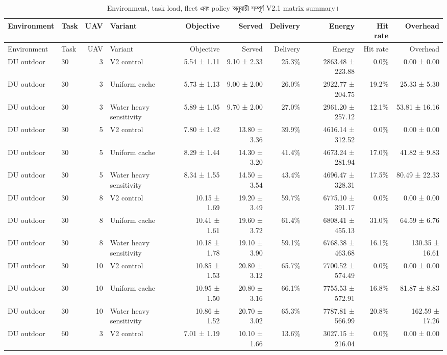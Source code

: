 \documentclass[10pt,a4paper]{article}
\begin{document}
\begin{landscape}
\scriptsize
\begin{longtable}{@{}llrlrrrrrr@{}}
\caption{Environment, task load, fleet এবং policy অনুযায়ী সম্পূর্ণ V2.1 matrix summary।}\\
\toprule Environment & Task & UAV & Variant & Objective & Served & Delivery & Energy & Hit rate & Overhead\\\midrule
\endfirsthead
\toprule Environment & Task & UAV & Variant & Objective & Served & Delivery & Energy & Hit rate & Overhead\\\midrule
\endhead
DU outdoor & 30 & 3 & V2 control & 5.54 ± 1.11 & 9.10 ± 2.33 & 25.3\% & 2863.48 ± 223.88 & 0.0\% & 0.00 ± 0.00 \\
DU outdoor & 30 & 3 & Uniform cache & 5.73 ± 1.13 & 9.00 ± 2.00 & 26.0\% & 2922.77 ± 204.75 & 19.2\% & 25.33 ± 5.30 \\
DU outdoor & 30 & 3 & Water heavy sensitivity & 5.89 ± 1.05 & 9.70 ± 2.00 & 27.0\% & 2961.20 ± 257.12 & 12.1\% & 53.81 ± 16.16 \\
DU outdoor & 30 & 5 & V2 control & 7.80 ± 1.42 & 13.80 ± 3.36 & 39.9\% & 4616.14 ± 312.52 & 0.0\% & 0.00 ± 0.00 \\
DU outdoor & 30 & 5 & Uniform cache & 8.29 ± 1.44 & 14.30 ± 3.20 & 41.4\% & 4673.24 ± 281.94 & 17.0\% & 41.82 ± 9.83 \\
DU outdoor & 30 & 5 & Water heavy sensitivity & 8.34 ± 1.55 & 14.50 ± 3.54 & 43.4\% & 4696.47 ± 328.31 & 17.5\% & 80.49 ± 22.33 \\
DU outdoor & 30 & 8 & V2 control & 10.15 ± 1.69 & 19.20 ± 3.49 & 59.7\% & 6775.10 ± 391.17 & 0.0\% & 0.00 ± 0.00 \\
DU outdoor & 30 & 8 & Uniform cache & 10.41 ± 1.61 & 19.60 ± 3.72 & 61.4\% & 6808.41 ± 455.13 & 31.0\% & 64.59 ± 6.76 \\
DU outdoor & 30 & 8 & Water heavy sensitivity & 10.18 ± 1.78 & 19.10 ± 3.90 & 59.1\% & 6768.38 ± 463.68 & 16.1\% & 130.35 ± 16.61 \\
DU outdoor & 30 & 10 & V2 control & 10.85 ± 1.53 & 20.80 ± 3.12 & 65.7\% & 7700.52 ± 574.49 & 0.0\% & 0.00 ± 0.00 \\
DU outdoor & 30 & 10 & Uniform cache & 10.95 ± 1.50 & 20.80 ± 3.16 & 66.1\% & 7755.53 ± 572.91 & 16.8\% & 81.87 ± 8.83 \\
DU outdoor & 30 & 10 & Water heavy sensitivity & 10.86 ± 1.52 & 20.70 ± 3.02 & 65.3\% & 7787.81 ± 566.99 & 20.8\% & 162.59 ± 17.26 \\
DU outdoor & 60 & 3 & V2 control & 7.01 ± 1.19 & 10.10 ± 1.66 & 13.6\% & 3027.15 ± 216.04 & 0.0\% & 0.00 ± 0.00 \\

\end{longtable}
\end{landscape}
\end{document}
